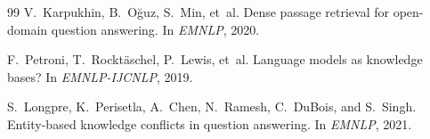 \documentclass[11pt]{article}
\begin{document}
\begin{thebibliography}{99}
V.~Karpukhin, B.~O\u{g}uz, S.~Min, et~al.
\newblock Dense passage retrieval for open-domain question answering.
\newblock In \emph{EMNLP}, 2020.

F.~Petroni, T.~Rockt\"aschel, P.~Lewis, et~al.
\newblock Language models as knowledge bases?
\newblock In \emph{EMNLP-IJCNLP}, 2019.

S.~Longpre, K.~Perisetla, A.~Chen, N.~Ramesh, C.~DuBois, and S.~Singh.
\newblock Entity-based knowledge conflicts in question answering.
\newblock In \emph{EMNLP}, 2021.

\end{thebibliography}
\end{document}
